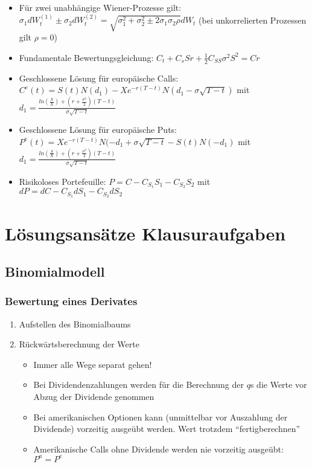 \begin{itemize}
\begin{itemize}
\begin{itemize}
			\item Für zwei unabhängige Wiener-Prozesse gilt: \(\sigma_1dW_t^{(1)} \pm \sigma_2dW_t^{(2)} = \sqrt{\sigma_1^2+\sigma_2^2 \pm 2\sigma_1\sigma_2\rho}dW_t\) (bei unkorrelierten Prozessen gilt \(\rho=0\))
			\item Fundamentale Bewertungsgleichung: \(C_t + C_sSr + \frac{1}{2}C_{SS}\sigma^2S^2 = Cr\)
			\item Geschlossene Lösung für europäische Calls: \(C^e(t) = S(t)N(d_1) - Xe^{-r(T-t)}N(d_1-\sigma\sqrt{T-t})\) mit \(d_1 = \frac{ln(\frac{S}{X})+(r+\frac{\sigma^2}{2})(T-t)}{\sigma\sqrt{T-t}}\)
			\item Geschlossene Lösung für europäische Puts: \(P^e(t) = Xe^{-r(T-t)}N(-d_1+\sigma\sqrt{T-t}-S(t)N(-d_1)\) mit \(d_1 = \frac{ln(\frac{S}{X})+(r+\frac{\sigma^2}{2})(T-t)}{\sigma\sqrt{T-t}}\)
			\item Risikoloses Portefeuille: \(P=C-C_{S_1}S_1-C_{S_2}S_2\) mit \(dP=dC-C_{S_1}dS_1-C_{S_2}dS_2\)
		\end{itemize}
	\end{itemize}
\end{itemize}



\section{Lösungsansätze Klausuraufgaben}

\subsection{Binomialmodell}

\subsubsection{Bewertung eines Derivates}
\begin{enumerate}
	\item Aufstellen des Binomialbaums
	\item Rückwärtsberechnung der Werte
	\begin{itemize}
		\item Immer alle Wege separat gehen!
		\item Bei Dividendenzahlungen werden für die Berechnung der \(q\)s die Werte vor Abzug der Dividende genommen
		\item Bei amerikanischen Optionen kann (unmittelbar vor Auszahlung der Dividende) vorzeitig ausgeübt werden. Wert trotzdem "`fertigberechnen"'
		\item Amerikanische Calls ohne Dividende werden nie vorzeitig ausgeübt: \(P^a=P^e\)
	\end{itemize}
\end{enumerate}

